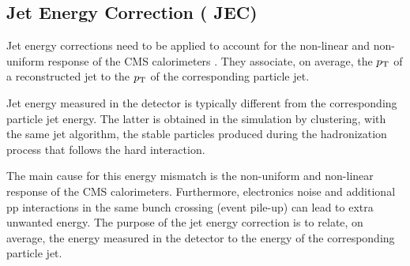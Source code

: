 \subsection{Jet Energy Correction ( JEC)}\label{jec}

Jet energy corrections need to be applied to account for the non-linear and non-uniform response of the CMS calorimeters \cite{jetcorrec}. They associate, on average, the $p_{\mathrm{T}}$ of a reconstructed jet to the $p_{\mathrm{T}}$ of the corresponding particle jet.

Jet energy measured in the detector is typically different from the corresponding particle jet energy. The latter is obtained in the simulation by clustering, with the same jet algorithm, the
stable particles produced during the hadronization process that follows the hard interaction.

The main cause for this energy mismatch is the non-uniform and non-linear response of the CMS calorimeters. Furthermore, electronics noise and additional pp interactions in the same
bunch crossing (event pile-up) can lead to extra unwanted energy. The purpose of the jet energy correction is to relate, on average, the energy measured in the detector to the energy of the corresponding particle jet.

